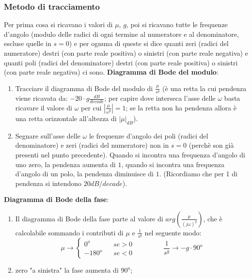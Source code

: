 \begin{landscape}
\begin{multicols*}{3}
    \subsubsection*{Metodo di tracciamento}
    Per prima cosa si ricavano i valori di $\mu$, $g$, poi si ricavano tutte le frequenze d'angolo (modulo delle radici di ogni termine al numeratore e al denominatore, escluse quelle in $s=0$) e per ognuna di queste si dice quanti zeri (radici del numeratore) destri (con parte reale positiva) o sinistri (con parte reale negativa) e quanti poli (radici del denominatore) destri (con parte reale positiva) o sinistri (con parte reale negativa) ci sono.\newline
    \newline
    \textbf{Diagramma di Bode del modulo}: 
    \begin{enumerate}
        \item Tracciare il diagramma di Bode del modulo di $\frac{\mu}{s^g}$ (è una retta la cui pendenza viene ricavata da: $-20 \cdot g \frac{dB}{decade}$; per capire dove interseca l'asse delle $\omega$ basta ricavare il valore di $\omega$ per cui $\left| \frac{\mu}{\omega^g} \right| = 1$; se la retta non ha pendenza allora è una retta orizzontale all'altezza di $|\mu|_{dB}$).
        \item Segnare sull'asse delle $\omega$ le frequenze d'angolo dei poli (radici del denominatore) e zeri (radici del numeratore) non in $s=0$ (perchè son già presenti nel punto precedente).\newline
        Quando si incontra una frequenza d'angolo di uno zero, la pendenza aumenta di $1$, quando si incontra una frequenza d'angolo di un polo, la pendenza diminuisce di $1$. (Ricordiamo che per 1 di pendenza si intendono $20 dB/decade$).
    \end{enumerate}
    \textbf{Diagramma di Bode della fase}:
    \begin{enumerate}
        \item Il diagramma di Bode della fase parte al valore di $arg(\frac{\mu}{(j \omega)^g})$, che è calcolabile sommando i contributi di $\mu$ e $\frac{1}{s^g}$ nel seguente modo:
        \[
            \mu \rightarrow \begin{cases}
                0^o \;\;\;& se > 0\\
                -180^o \;\;\; & se <0
            \end{cases} \;\;\;\;\;\;\;\;\;\;\;\;\;\;\; \frac{1}{s^g}\rightarrow -g \cdot 90^o
        \]
        \item zero "a sinistra" la fase aumenta di $90^o$;\newline

\end{enumerate}
\end{multicols*}
\end{landscape}
